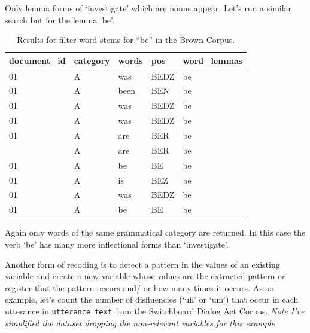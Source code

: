 \documentclass[
  letterpaper,
]{scrbook}
\begin{document}
Only lemma forms of `investigate' which are nouns appear. Let's run a
similar search but for the lemma `be'.

\hypertarget{tbl-recoding-lemmatization-brown-be}{}
\begin{table}
\caption{\label{tbl-recoding-lemmatization-brown-be}Results for filter word stems for ``be'' in the Brown Corpus. }\tabularnewline

\centering
\begin{tabular}{lllll}
\toprule
document\_id & category & words & pos & word\_lemmas\\
\midrule
01 & A & was & BEDZ & be\\
01 & A & been & BEN & be\\
01 & A & was & BEDZ & be\\
01 & A & was & BEDZ & be\\
01 & A & are & BER & be\\
\addlinespace
01 & A & are & BER & be\\
01 & A & be & BE & be\\
01 & A & is & BEZ & be\\
01 & A & was & BEDZ & be\\
01 & A & be & BE & be\\
\bottomrule
\end{tabular}
\end{table}

Again only words of the same grammatical category are returned. In this
case the verb `be' has many more inflectional forms than `investigate'.

Another form of recoding is to detect a pattern in the values of an
existing variable and create a new variable whose values are the
extracted pattern or register that the pattern occurs and/ or how many
times it occurs. As an example, let's count the number of disfluencies
(`uh' or `um') that occur in each utterance in \texttt{utterance\_text}
from the Switchboard Dialog Act Corpus. \emph{Note I've simplified the
dataset dropping the non-relevant variables for this example.}
\end{document}
